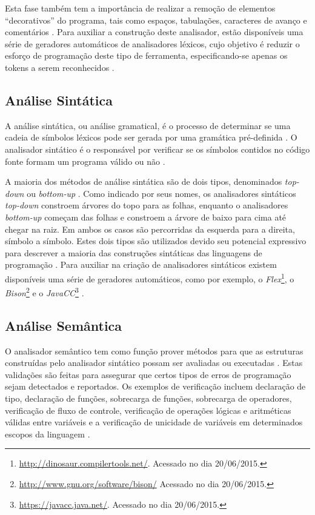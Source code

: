 Esta fase também tem a importância de realizar a remoção de elementos 
“decorativos” do programa, tais como espaços, tabulações, caracteres de 
avanço e comentários \cite[pág. 59]{ref15}. Para auxiliar a construção deste analisador,
 estão disponíveis uma série de geradores automáticos de analisadores léxicos, 
cujo objetivo é reduzir o esforço de programação deste tipo de ferramenta, 
especificando-se apenas os tokens a serem reconhecidos \cite[pág. 50]{ref18}.

\subsection{Análise Sintática}

A análise sintática, ou análise gramatical, é o processo de determinar 
se uma cadeia de símbolos léxicos pode ser gerada por uma gramática pré-definida
 \cite{ref19}. O analisador sintático é o responsável por verificar se os 
símbolos contidos no código fonte formam um programa válido ou não \cite[pág. 38]{ref20}.

A maioria dos métodos de análise sintática são de dois tipos, denominados 
\textit{top-down} ou \textit{bottom-up} \cite[pág.  227]{ref21}. Como indicado por 
seus nomes, os analisadores sintáticos \textit{top-down} constroem árvores 
do topo para as folhas, enquanto o analisadores \textit{bottom-up} começam das 
folhas e constroem a árvore de baixo para cima até chegar na raiz. Em ambos os
 casos são percorridas da esquerda para a direita, 
símbolo a símbolo. Estes dois tipos são utilizados devido seu potencial 
expressivo para descrever a maioria das construções sintáticas das linguagens 
de programação \cite[pág. 38]{ref20}. Para auxiliar na criação de analisadores sintáticos 
existem disponíveis uma série de geradores automáticos, como por exemplo, 
o \textit{Flex}\footnote{\url{http://dinosaur.compilertools.net/}. Acessado no dia 20/06/2015.}, 
o \textit{Bison}\footnote{\url{http://www.gnu.org/software/bison/} Acessado no dia 20/06/2015.}
 e o \textit{JavaCC}\footnote{\url{https://javacc.java.net/}. Acessado no dia 20/06/2015.}
 \cite[pág. 30]{ref22}.

\subsection{Análise Semântica}

O analisador semântico tem como função prover métodos para que as estruturas 
construídas pelo analisador sintático possam ser avaliadas ou executadas \cite[pág. 337]{ref23}. 
Estas validações são feitas para assegurar que certos tipos de erros de 
programação sejam detectados e reportados. Os  exemplos de verificação incluem 
declaração de tipo, declaração de funções, sobrecarga de funções, sobrecarga de 
operadores, verificação de fluxo de controle, verificação de operações lógicas e 
aritméticas válidas entre variáveis e a verificação de unicidade de variáveis em 
determinados escopos da linguagem \cite[pág. 147]{ref6}.

